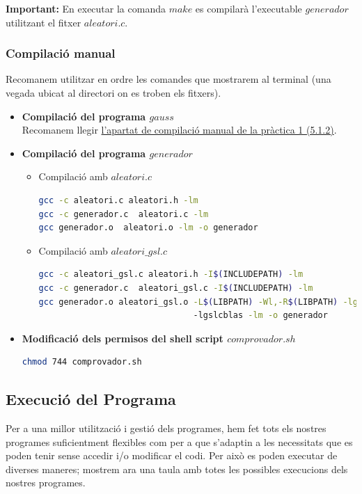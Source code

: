 \documentclass[a4paper, 11pt]{article}
\begin{document}
\hspace{-1.5em}\textbf{Important:} En executar la comanda $make$ es compilarà l'executable $generador$ utilitzant el fitxer $aleatori.c$.

\newpage
\subsubsection{Compilació manual}
Recomanem utilitzar en ordre les comandes que mostrarem al terminal (una vegada ubicat al directori on es troben els fitxers).
\begin{itemize}
    \item \textbf{Compilació del programa $gauss$}\\
    Recomanem llegir \textcolor{blue}{\href{https://www.overleaf.com/read/dncxfhyjpjgv}{l'apartat de compilació manual de la pràctica 1 (5.1.2)}}.
    
    \item \textbf{Compilació del programa $generador$}\\
    \begin{itemize}
        \item Compilació amb $aleatori.c$
        \begin{lstlisting}[language=BASH]
gcc -c aleatori.c aleatori.h -lm
gcc -c generador.c  aleatori.c -lm
gcc generador.o  aleatori.o -lm -o generador
        \end{lstlisting}
        \item Compilació amb $aleatori\_gsl.c$
        \begin{lstlisting}[language=BASH]
gcc -c aleatori_gsl.c aleatori.h -I$(INCLUDEPATH) -lm
gcc -c generador.c  aleatori_gsl.c -I$(INCLUDEPATH) -lm
gcc generador.o aleatori_gsl.o -L$(LIBPATH) -Wl,-R$(LIBPATH) -lgsl 
                               -lgslcblas -lm -o generador
        \end{lstlisting}
    \end{itemize}

    \item \textbf{Modificació dels permisos del shell script $comprovador.sh$}
    \begin{lstlisting}[language=BASH]
    chmod 744 comprovador.sh
    \end{lstlisting}
\end{itemize}


\newpage

\subsection{Execució del Programa}
Per a una millor utilització i gestió dels programes, hem fet tots els nostres programes suficientment flexibles com per a que s'adaptin a les necessitats que es poden tenir sense accedir i/o modificar el codi. Per això es poden executar de diverses maneres; mostrem ara una taula amb totes les possibles execucions dels nostres programes.
\end{document}
